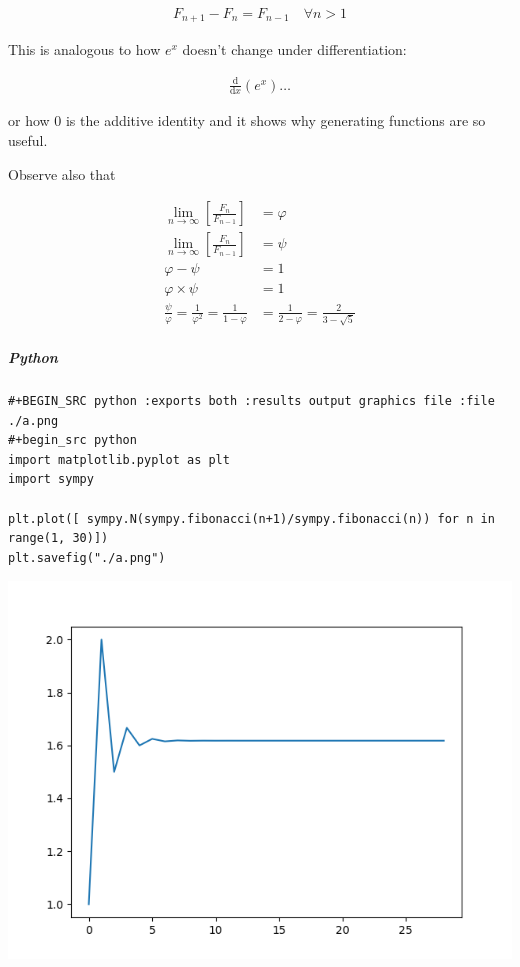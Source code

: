 \documentclass[11pt]{article}
\begin{document}
\[\begin{aligned}
F_{n+ 1} - F_{n} = F_{n- 1} \quad \forall n > 1
\end{aligned}\]

This is analogous to how \(e^x\) doesn't change under differentiation:

$$\begin{aligned}
\frac{\mathrm{d} }{\mathrm{d} x}\left( e^x \right) \ldots
\end{aligned}$$

or how 0 is the additive identity and it shows why generating functions
are so useful.

Observe also that

$$\begin{aligned}
\lim_{n     \rightarrow \infty }\left[ \frac{F_n}{F_{n- 1} }  \right] &= \varphi \\
\lim_{n     \rightarrow \infty }\left[ \frac{F_n}{F_{n- 1} }  \right] &= \psi \\
\varphi - \psi &=  1 \\
\varphi \times  \psi  &= 1 \\
\frac{\psi}{\varphi}  = \frac{1}{\varphi^2} = \frac{1}{1-\varphi} &= \frac{1}{2-\varphi} = \frac{2}{3 - \sqrt{5}  }
\end{aligned}$$
\subparagraph{Python}
\label{sec:org681e86b}

\lstset{language=:exports,label= ,caption= ,captionpos=b,numbers=none}
\begin{lstlisting}
#+BEGIN_SRC python :exports both :results output graphics file :file ./a.png
#+begin_src python
import matplotlib.pyplot as plt
import sympy

plt.plot([ sympy.N(sympy.fibonacci(n+1)/sympy.fibonacci(n)) for n in range(1, 30)])
plt.savefig("./a.png")
\end{lstlisting}
\begin{center}
\includegraphics[width=.9\linewidth]{./a.png}
\end{center}
\end{document}
